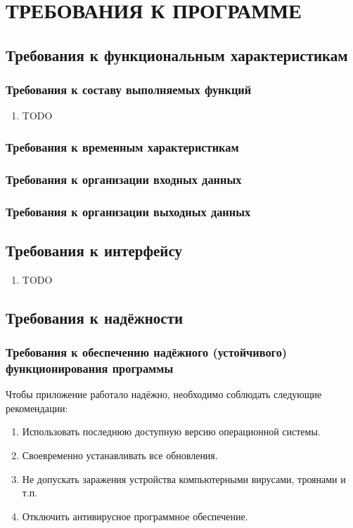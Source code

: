\section{ТРЕБОВАНИЯ К ПРОГРАММЕ}

\subsection{Требования к функциональным характеристикам}
\label{requirements.features}
    \subsubsection{Требования к составу выполняемых функций}
        \begin{enumerate}[series=requirements]
        	\item TODO
        \end{enumerate}

    \subsubsection{Требования к временным характеристикам}

    \subsubsection{Требования к организации входных данных}
    
    \subsubsection{Требования к организации выходных данных}

\subsection{Требования к интерфейсу}
\label{requirements.interface}
    \begin{enumerate}
    	\item TODO
    \end{enumerate}

\subsection{Требования к надёжности}
\label{requirements.quality}
    \subsubsection{Требования к обеспечению надёжного (устойчивого) функционирования программы}
Чтобы приложение работало надёжно, необходимо соблюдать следующие рекомендации:
\begin{enumerate}
	\item Использовать последнюю доступную версию операционной системы.
	\item Своевременно устанавливать все обновления.
	\item Не допускать заражения устройства компьютерными вирусами, троянами и т.п.
	\item Отключить антивирусное программное обеспечение.
\end{enumerate}

